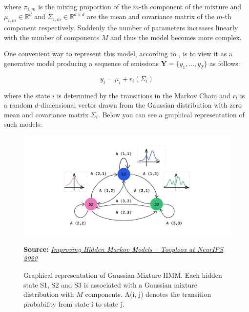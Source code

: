 where $\pi_{i,m}$ is the mixing proportion of the $m$-th component of the mixture and $\mu_{i,m} \in \mathbb{R}^d$ and $\Sigma_{i,m} \in \mathbb{R}^{d \times d}$ are the mean and covariance matrix of the $m$-th component respectively. Suddenly the number of parameters
increases linearly with the number of components $M$ and thus the model becomes more complex.

One convenient way to represent this model, according to \citep{Yu2015}, is to view it as a generative model producing a sequence of emissions $\textbf{Y} = \{y_1,\ldots,y_T\}$ as follows:

\begin{equation}
    y_t = \mu_{i} + r_t(\Sigma_{i})
\end{equation}

where the state $i$ is determined by the transitions in the Markov Chain and $r_t$ is a random $d$-dimensional vector drawn from the Gaussian distribution with zero mean and covariance matrix $\Sigma_{i}$.
Below you can see a graphical representation of such models:

\begin{figure}[htbp]
    \begin{center}
        \includegraphics[width=1.0\textwidth]{Figs/gaussian_hmm.png}
        \caption*{\textbf{Source:} \href{https://tooploox.com/improving-hidden-markov-models-tooploox-at-neurips-2022s}{\textit{Improving Hidden Markov Models – Tooploox at NeurIPS 2022}}}
        \caption[Diagram of Gaussian Hidden Markov Model representation]{Graphical representation of Gaussian-Mixture HMM. Each hidden state S1, S2 and S3 is associated with a Gaussian mixture distribution with $M$ components. A(i, j) denotes the transition probability from state i to state j.}
        \label{fig:guaussian_hmm}
    \end{center}
\end{figure}

